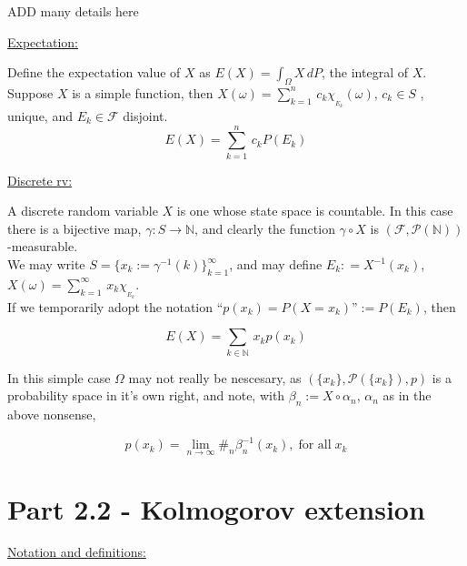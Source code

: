 \documentclass[12pt]{article}
\newcommand{\pset}[1]{ \mathcal{P}(#1) }
\newcommand{\nats}[0] { \mathbb{N}}
\newcommand{\F}[0] { \mathcal{F} }
\newcommand{\om}[0] { \omega }
\newcommand{\Om}[0] { \Omega }
\newcommand{\rarw}[0] { \rightarrow }
\begin{document}
ADD many details here



\begin{flushleft}
\underline{Expectation:}
\end{flushleft}

Define the expectation value of $X$ as $E(X) = \int_{\Om} X \, dP$, the integral of $X$.\\

Suppose $X$ is a simple function, then $X(\om) = \sum_{k=1}^n \, c_k \chi_{_{E_k}} (\om)$, $c_k \in S$ , unique, and $E_k \in \F$ disjoint.\\

$$
	E(X) =  \sum_{k=1}^n \, c_k P(E_k)
$$

\begin{flushleft}
\underline{Discrete rv:}
\end{flushleft}

A discrete random variable $X$ is one whose state space is countable. In this case there is a bijective map, $\gamma : S \rarw \nats$, and clearly the function $\gamma \circ X	$ is $( \F, \pset{\nats} )$-measurable. \\ We may write $S = \{ x_k := \gamma^{-1}(k) \}_{k=1}^\infty$, and may define $E_k :	= X^{-1}(x_k)$, $X(\omega) = \sum_{k=1}^\infty \, x_k \chi_{_{E_k}} $. \\ If we temporarily adopt the notation ``$p(x_k) = P(X = x_k)$''$ := P(E_k)$, then


$$
	E(X) =  \sum_{k \in \nats} \, x_k p(x_k)
$$

In this simple case $\Om$ may not really be nescesary, as $( \{x_k \}, \pset{\{x_k\}}, p)$ is a probability space in it's own right, and note, with $\beta_n := X \circ \alpha_n$, $\alpha_n$ as in the above nonsense,

$$
	p(x_k) = \lim_{n \rarw \infty} \#_n \beta_n^{-1} ( x_k ), \; \textrm{for all} \; x_k
$$







\section*{Part 2.2 - Kolmogorov extension }

\begin{flushleft}
\underline{Notation and definitions:}
\end{flushleft}
\end{document}
